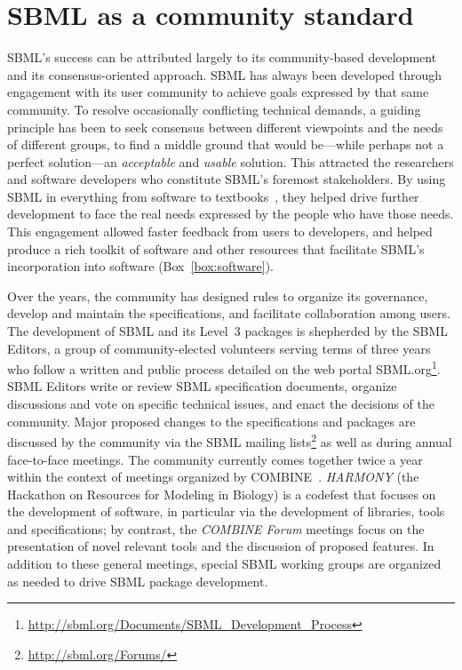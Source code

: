 \documentclass{sbml-paper}
\begin{document}
\hrulefill

\newpage
\section*{SBML as a community standard}

SBML's success can be attributed largely to its community-based development and its consensus-oriented approach. SBML has always been developed through engagement with its user community to achieve goals expressed by that same community. To resolve occasionally conflicting technical demands, a guiding principle has been to seek consensus between different viewpoints and the needs of different groups, to find a middle ground that would be---while perhaps not a perfect solution---an \emph{acceptable} and \emph{usable} solution. This attracted the researchers and software developers who constitute SBML's foremost stakeholders. By using SBML in everything from software to textbooks~\citep[e.g.,][]{Cesario2011cancer, Wilkinson2018stochastic, Klipp2016systems, Liu2009systems, Choi2008introduction, Sauro2014systems}, they helped drive further development to face the real needs expressed by the people who have those needs.  This engagement allowed faster feedback from users to developers, and helped produce a rich toolkit of software and other resources that facilitate SBML's incorporation into software (Box~\ref{box:software}).

Over the years, the community has designed rules to organize its governance, develop and maintain the specifications, and facilitate collaboration among users.  The development of SBML and its Level~3 packages is shepherded by the SBML Editors, a group of community-elected volunteers serving terms of three years who follow a written and public process detailed on the web portal SBML.org\footnote{\url{http://sbml.org/Documents/SBML_Development_Process}}.  SBML Editors write or review SBML specification documents, organize discussions and vote on specific technical issues, and enact the decisions of the community.  Major proposed changes to the specifications and packages are discussed by the community via the SBML mailing lists\footnote{\url{http://sbml.org/Forums/}} as well as during annual face-to-face meetings.  The community currently comes together twice a year within the context of meetings organized by COMBINE~\citep[the Computational Modeling in Biology Network;][]{Hucka2015promotinga}.  \emph{HARMONY} (the Hackathon on Resources for Modeling in Biology) is a codefest that focuses on the development of software, in particular via the development of libraries, tools and specifications; by contrast, the \emph{COMBINE Forum} meetings focus on the presentation of novel relevant tools and the discussion of proposed features.  In addition to these general meetings, special SBML working groups are organized as needed to drive SBML package development.
\end{document}
